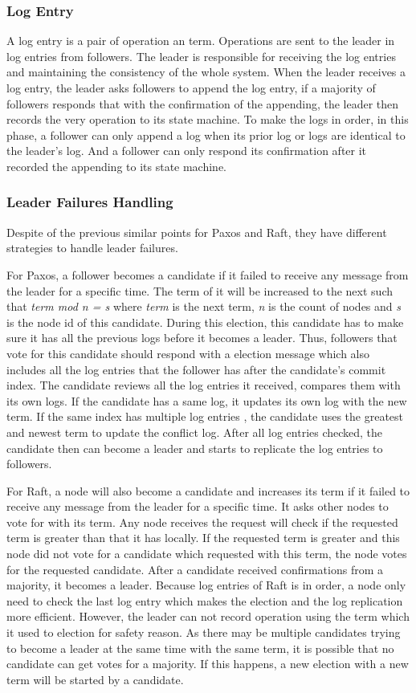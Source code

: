 \documentclass[12pt, a4paper]{article}
\begin{document}
\subsubsection{Log Entry}
A log entry is a pair of operation an term. Operations are sent to the leader
in log entries from followers. The leader is responsible for receiving the log entries and
maintaining the consistency of the whole system.
When the leader receives a log entry, the leader asks followers to append the log entry,
if a majority of followers responds that with the confirmation of the appending,
the leader then records the very operation to its state machine.
To make the logs in order, in this phase, a follower can only append a log when
its prior log or logs are identical to the leader's log. And a follower can only
respond its confirmation after it recorded the appending to its state machine.

\subsubsection{Leader Failures Handling}
Despite of the previous similar points for Paxos and Raft, they have different
strategies to handle leader failures.

For Paxos, a follower becomes a candidate if it failed to receive any message
from the leader for a specific time.
The term of it will be increased to the next such that
\textit{term mod n = s} where \textit{term} is the next term,
\textit{n} is the count of nodes and \textit{s} is the node id of this candidate.
During this election, this candidate has to make sure it has all the previous logs
before it becomes a leader. Thus, followers that vote for this candidate should respond
with a election message which also includes all the log entries that the follower
has after the candidate’s commit index.
The candidate reviews all the log entries it received, compares them with its own logs.
If the candidate has a same log, it updates its own log with the new term.
If the same index has multiple log entries , the candidate uses the
greatest and newest term to update the conflict log.
After all log entries checked, the candidate then can become a leader
and starts to replicate the log entries to followers.

For Raft, a node will also become a candidate and increases its term
if it failed to receive any message from the leader for a specific time.
It asks other nodes to vote for with its term.
Any node receives the request will check
if the requested term is greater than that it has locally.
If the requested term is greater and this node did not vote for a candidate
which requested with this term, the node votes for the requested candidate.
After a candidate received confirmations from a majority, it becomes a leader.
Because log entries of Raft is in order, a node only need to check the last
log entry which makes the election and the log replication more efficient.
However, the leader can not record operation using the term which it used
to election for safety reason.
As there may be multiple candidates trying to become a leader at the same
time with the same term, it is possible that no candidate can get votes for a majority.
If this happens, a new election with a new term will be started by a candidate.
\end{document}
